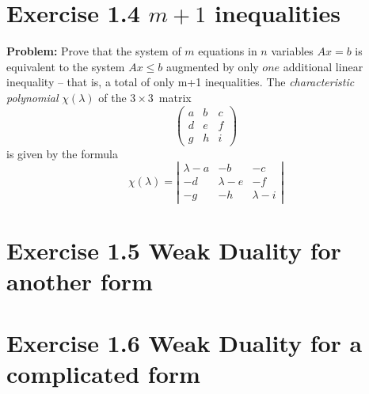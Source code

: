 \section{Exercise 1.4 $m+1$ inequalities}
\textbf{Problem:} Prove that the system of $m$ equations in $n$ variables $Ax=b$ is equivalent to the system $Ax\leq b$ augmented by only $one$ additional linear inequality -- that is, a total of only m+1 inequalities.
The \emph{characteristic polynomial} $\chi(\lambda)$ of the
$3 \times 3$~matrix
\[ \left( \begin{array}{ccc}
a & b & c \\
d & e & f \\
g & h & i \end{array} \right)\] 
is given by the formula
\begin{equation}
\chi(\lambda) = \left| \begin{array}{ccc}
\lambda - a & -b & -c \\
-d & \lambda - e & -f \\
-g & -h & \lambda - i \end{array} \right|
\end{equation}
\section{Exercise 1.5 Weak Duality for another form}

\section{Exercise 1.6 Weak Duality for a complicated form}
